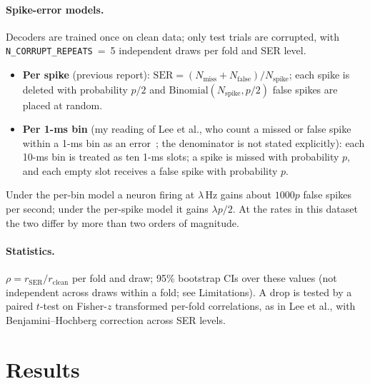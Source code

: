 \documentclass[11pt,a4paper]{article}
\begin{document}
\paragraph{Spike-error models.}\label{sec:ser}
Decoders are trained once on clean data; only test trials are corrupted, with \texttt{N\_CORRUPT\_REPEATS}~=~5
independent draws per fold and SER level.
\begin{itemize}
  \item \textbf{Per spike} (previous report): $\mathrm{SER}=(N_{\mathrm{miss}}+N_{\mathrm{false}})/N_{\mathrm{spike}}$;
  each spike is deleted with probability $p/2$ and $\mathrm{Binomial}(N_{\mathrm{spike}},p/2)$ false spikes are placed at random.
  \item \textbf{Per 1-ms bin} (my reading of Lee et al., who count a missed or false spike within a 1-ms bin as an
  error~\cite{lee2024}; the denominator is not stated explicitly): each 10-ms bin is treated as ten 1-ms slots; a
  spike is missed with probability $p$, and each empty slot receives a false spike with probability $p$.
\end{itemize}
Under the per-bin model a neuron firing at $\lambda$\,Hz gains about $1000p$ false spikes per second; under the
per-spike model it gains $\lambda p/2$. At the rates in this dataset the two differ by more than two orders of magnitude.

\paragraph{Statistics.} $\rho=r_{\mathrm{SER}}/r_{\mathrm{clean}}$ per fold and draw; 95\% bootstrap CIs over these
values (not independent across draws within a fold; see Limitations). A drop is tested by a paired $t$-test on Fisher-$z$ transformed per-fold correlations, as in Lee et al.,
with Benjamini--Hochberg correction across SER levels.

\section{Results}
\end{document}
